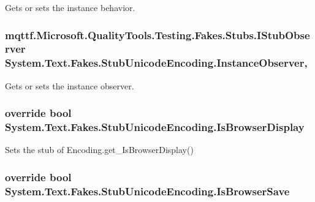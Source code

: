 Gets or sets the instance behavior.

\hypertarget{class_system_1_1_text_1_1_fakes_1_1_stub_unicode_encoding_a8d6a93c965efcdfc63237ea78a271b9e}{
\subsubsection[{Instance\-Observer}]{\setlength{\rightskip}{0pt plus 5cm}mqttf.\-Microsoft.\-Quality\-Tools.\-Testing.\-Fakes.\-Stubs.\-I\-Stub\-Observer System.\-Text.\-Fakes.\-Stub\-Unicode\-Encoding.\-Instance\-Observer\hspace{0.3cm}{\ttfamily [get]}, {\ttfamily [set]}}}\label{class_system_1_1_text_1_1_fakes_1_1_stub_unicode_encoding_a8d6a93c965efcdfc63237ea78a271b9e}


Gets or sets the instance observer.

\hypertarget{class_system_1_1_text_1_1_fakes_1_1_stub_unicode_encoding_a96832a0295994a766c2a88c6bdf3f4e9}{
\subsubsection[{Is\-Browser\-Display}]{\setlength{\rightskip}{0pt plus 5cm}override bool System.\-Text.\-Fakes.\-Stub\-Unicode\-Encoding.\-Is\-Browser\-Display\hspace{0.3cm}{\ttfamily [get]}}}\label{class_system_1_1_text_1_1_fakes_1_1_stub_unicode_encoding_a96832a0295994a766c2a88c6bdf3f4e9}


Sets the stub of Encoding.\-get\-\_\-\-Is\-Browser\-Display()

\hypertarget{class_system_1_1_text_1_1_fakes_1_1_stub_unicode_encoding_ac066bf520d375cf875a81e7ba078bb77}{
\subsubsection[{Is\-Browser\-Save}]{\setlength{\rightskip}{0pt plus 5cm}override bool System.\-Text.\-Fakes.\-Stub\-Unicode\-Encoding.\-Is\-Browser\-Save\hspace{0.3cm}{\ttfamily [get]}}}\label{class_system_1_1_text_1_1_fakes_1_1_stub_unicode_encoding_ac066bf520d375cf875a81e7ba078bb77}


